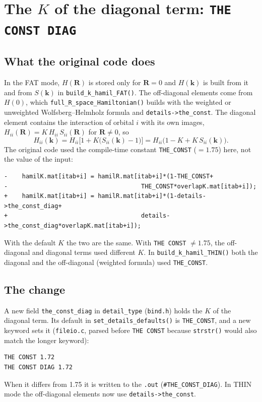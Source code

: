 \documentclass[11pt,a4paper]{article}
\newcommand{\file}[1]{\texttt{#1}}
\newcommand{\fn}[1]{\texttt{#1()}}
\newcommand{\var}[1]{\texttt{#1}}
\begin{document}
\section{The $K$ of the diagonal term: \texttt{THE CONST DIAG}}\label{sec:kdiag}

\subsection{What the original code does}

In the FAT mode, $H(\mathbf{R})$ is stored only for $\mathbf{R}=0$ and $H(\mathbf{k})$ is
built from it and from $S(\mathbf{k})$ in \fn{build\_k\_hamil\_FAT}. The off-diagonal
elements come from $H(0)$, which \fn{full\_R\_space\_Hamiltonian} builds with the
weighted or unweighted Wolfsberg--Helmholz formula and \var{details->the\_const}. The
diagonal element contains the interaction of orbital $i$ with its own images,
$H_{ii}(\mathbf{R})=K\,H_{ii}\,S_{ii}(\mathbf{R})$ for $\mathbf{R}\neq0$, so
\begin{equation}
H_{ii}(\mathbf{k}) = H_{ii}\Big[1 + K\big(S_{ii}(\mathbf{k})-1\big)\Big] = H_{ii}\big(1-K+K\,S_{ii}(\mathbf{k})\big).
\end{equation}
The original code used the compile-time constant \var{THE\_CONST} ($=1.75$) here, not
the value of the input:
\begin{lstlisting}[style=diff,caption={\file{K\_hamil.c}, \fn{build\_k\_hamil\_FAT}}]
-    hamilK.mat[itab+i] = hamilR.mat[itab+i]*(1-THE_CONST+
-                                     THE_CONST*overlapK.mat[itab+i]);
+    hamilK.mat[itab+i] = hamilR.mat[itab+i]*(1-details->the_const_diag+
+                                     details->the_const_diag*overlapK.mat[itab+i]);
\end{lstlisting}
With the default $K$ the two are the same. With \texttt{THE CONST} $\neq1.75$, the
off-diagonal and diagonal terms used different $K$. In \fn{build\_k\_hamil\_THIN} both the
diagonal and the off-diagonal (weighted formula) used \var{THE\_CONST}.

\subsection{The change}

A new field \var{the\_const\_diag} in \var{detail\_type} (\file{bind.h}) holds the $K$ of
the diagonal term. Its default in \fn{set\_details\_defaults} is \var{THE\_CONST}, and a new
keyword sets it (\file{fileio.c}, parsed before \texttt{THE CONST} because
\fn{strstr} would also match the longer keyword):
\begin{lstlisting}[style=sh]
THE CONST 1.72
THE CONST DIAG 1.72
\end{lstlisting}
When it differs from 1.75 it is written to the \texttt{.out}
(\texttt{\#THE\_CONST\_DIAG}). In THIN mode the off-diagonal elements now use
\var{details->the\_const}.
\end{document}
